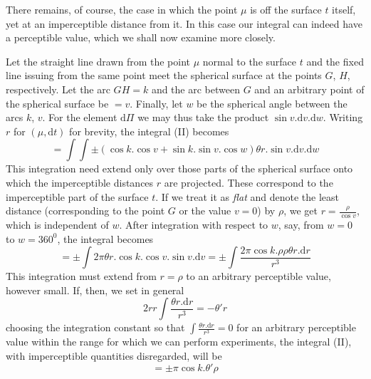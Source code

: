 There remains, of course, the case in which the point $\mu$ is off the surface $t$ itself, yet at an imperceptible distance from it. In this case our integral can indeed have a perceptible value, which we shall now examine more closely.

Let the straight line drawn from the point $\mu$ normal to the surface $t$ and the fixed line issuing from the same point meet the spherical surface at the points $G$, $H$, respectively. Let the arc $GH=k$ and the arc between $G$ and an arbitrary point of the spherical surface be $=v$. Finally, let $w$ be the spherical angle between the arcs $k$, $v$. For the element $\mathrm{d}\Pi$ we may thus take the product $\sin v.\mathrm{d}v.\mathrm{d}w$. Writing $r$ for $(\mu,\mathrm{d}t)$ for brevity, the integral (II) becomes
\[
=\int\int\pm(\cos k.\cos v+\sin k.\sin v.\cos w)\theta r.\sin v.\mathrm{d}v.\mathrm{d}w
\]
This integration need extend only over those parts of the spherical surface onto which the imperceptible distances $r$ are projected. These correspond to the imperceptible part of the surface $t$. If we treat it as \textit{flat} and denote the least distance (corresponding to the point $G$ or the value $v=0$) by $\rho$, we get $r=\frac{\rho}{\cos v}$, which is independent of $w$. After integration with respect to $w$, say, from $w=0$ to $w=360^0$, the integral becomes
\[
=\pm\int2\pi\theta r.\cos k.\cos v.\sin v.\mathrm{d}v=\pm\int\frac{2\pi\cos k.\rho\rho\theta r.\mathrm{d}r}{r^3}
\]
This integration must extend from $r=\rho$ to an arbitrary perceptible value, however small. If, then, we set in general
\[
2rr\int\frac{\theta r.\mathrm{d}r}{r^3}=-\theta'r
\]
choosing the integration constant so that $\int\frac{\theta r.\mathrm{d}r}{r^3}=0$ for an arbitrary perceptible value within the range for which we can perform experiments, the integral (II), with imperceptible quantities disregarded, will be
\[
=\pm\pi\cos k.\theta'\rho
\]


